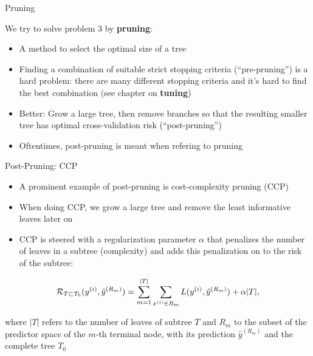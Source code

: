 \documentclass[11pt,compress,t,notes=noshow, xcolor=table]{beamer}
\begin{document}
\begin{vbframe}{Pruning}

We try to solve problem 3 by \textbf{pruning}:

\begin{itemize}
\item A method to select the optimal size of a tree
\item Finding a combination of suitable strict stopping criteria (\enquote{pre-pruning}) is a hard problem: there are many different stopping criteria and it's hard to find the best combination (see chapter on \textbf{tuning})
\item Better: Grow a large tree, then remove branches so that the resulting smaller tree has optimal cross-validation risk (\enquote{post-pruning})
\item Oftentimes, post-pruning is meant when refering to pruning

\end{itemize}
\end{vbframe}

\begin{vbframe}{Post-Pruning: CCP}
\begin{itemize}
\item A prominent example of post-pruning is cost-complexity pruning (CCP)
\item When doing CCP, we grow a large tree and remove the least informative leaves later on
\item CCP is steered with a regularization parameter $\alpha$ that penalizes the number of leaves in a subtree (complexity) and adds this penalization on to the risk of the subtree:
\end{itemize}

$$\mathcal{R}_{T \subset T_0}(y^{(i)}, \hat{y}^{(R_m)}) = \sum_{m=1}^{|T|} \sum_{x^{(i)} \in R_m} L(y^{(i)}, \hat{y}^{(R_m)}) + \alpha |T|,$$

where $|T|$ refers to the number of leaves of subtree $T$ and $R_m$ to the subset of the predictor space of the $m$-th terminal node, with its prediction $\hat{y}^{(R_m)}$ and the complete tree $T_0$

\end{vbframe}
\end{document}
